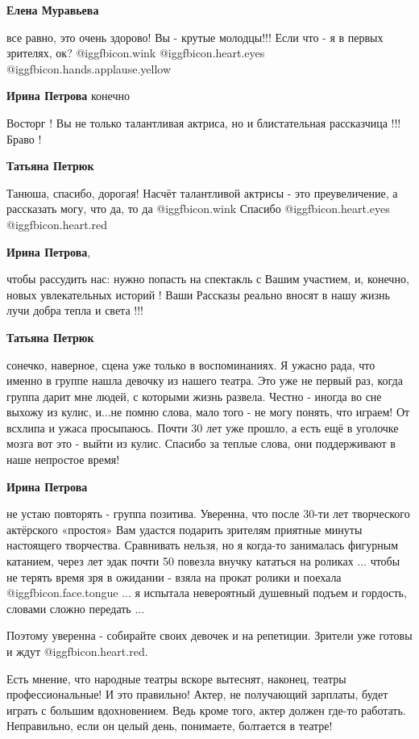 \begin{itemize}
\begin{itemize}
\textbf{Елена Муравьева} 

все равно, это очень здорово! Вы - крутые молодцы!!! Если что - я в первых
зрителях, ок? @igg{fbicon.wink}  @igg{fbicon.heart.eyes}
@igg{fbicon.hands.applause.yellow} 

\textbf{Ирина Петрова} конечно
\end{itemize} %


Восторг ! Вы не только талантливая актриса, но и блистательная рассказчица !!!
Браво !

\begin{itemize} %
\textbf{Татьяна Петрюк} 

Танюша, спасибо, дорогая! Насчёт талантливой актрисы - это преувеличение, а
рассказать могу, что да, то да @igg{fbicon.wink}  Спасибо
@igg{fbicon.heart.eyes} @igg{fbicon.heart.red}

\begin{itemize} %
\textbf{Ирина Петрова}, 

чтобы рассудить нас: нужно попасть на спектакль с Вашим участием, и,
конечно, новых увлекательных историй ! Ваши Рассказы реально вносят в нашу
жизнь лучи добра тепла и света !!!

\textbf{Татьяна Петрюк} 

сонечко, наверное, сцена уже только в воспоминаниях. Я ужасно рада, что именно
в группе нашла девочку из нашего театра. Это уже не первый раз, когда группа
дарит мне людей, с которыми жизнь развела. Честно - иногда во сне выхожу из
кулис, и...не помню слова, мало того - не могу понять, что играем! От всхлипа и
ужаса просыпаюсь. Почти 30 лет уже прошло, а есть ещё в уголочке мозга вот это
- выйти из кулис. Спасибо за теплые слова, они поддерживают в наше непростое
время!

\textbf{Ирина Петрова} 

не устаю повторять - группа позитива. Уверенна, что после 30-ти лет творческого
актёрского «простоя» Вам удастся подарить зрителям приятные минуты настоящего
творчества. Сравнивать нельзя, но я когда-то занималась фигурным катанием,
через лет эдак почти 50 повезла внучку кататься на роликах ... чтобы не терять
время зря в ожидании - взяла на прокат ролики и поехала  @igg{fbicon.face.tongue} ... я испытала
невероятный душевный подъем и гордость, словами сложно передать ...

Поэтому уверенна - собирайте своих девочек и на репетиции. Зрители уже готовы и
ждут @igg{fbicon.heart.red}.
\end{itemize} %

\end{itemize} %


Есть мнение, что народные театры вскоре вытеснят, наконец, театры
профессиональные! И это правильно! Актер, не получающий зарплаты, будет играть
с большим вдохновением. Ведь кроме того, актер должен где-то работать.
Неправильно, если он целый день, понимаете, болтается в театре!

\end{itemize} %
